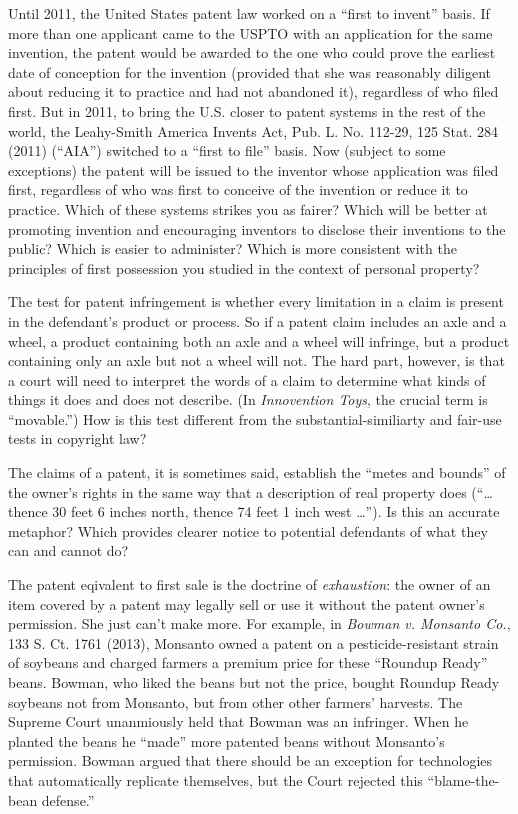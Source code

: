 \item Until 2011, the United States patent law worked on a ``first to invent''
basis. If more than one applicant came to the USPTO with an application for the
same invention, the patent would be awarded to the one who could prove the
earliest date of conception for the invention (provided that she was reasonably
diligent about reducing it to practice and had not abandoned it), regardless of
who filed first. But in 2011, to bring the U.S. closer to patent systems in the
rest of the world, the Leahy-Smith America Invents Act, Pub. L. No. 112-29, 125
Stat. 284 (2011) (``AIA'') switched to a ``first to file'' basis.  Now (subject
to some exceptions) the patent will be issued to the inventor whose application
was filed first, regardless of who was first to conceive of the invention or
reduce it to practice. Which of these systems strikes you as fairer? Which will
be better at promoting invention and encouraging inventors to disclose their
inventions to the public? Which is easier to administer? Which is more
consistent with the principles of first possession you studied in the context
of personal property?

\item The test for patent infringement is whether every limitation in a claim is
present in the defendant's product or process. So if a patent claim includes an
axle and a wheel, a product containing both an axle and a wheel will infringe,
but a product containing only an axle but not a wheel will not. The hard part,
however, is that a court will need to interpret the words of a claim to
determine what kinds of things it does and does not describe. (In
\textit{Innovention Toys}, the crucial term is ``movable.'') How is this test
different from the substantial-similiarty and fair-use tests in copyright law?

The claims of a patent, it is sometimes said, establish the ``metes and bounds''
of the owner's rights in the same way that a description of real property does
(``{\dots} thence 30 feet 6 inches north, thence 74 feet 1 inch west
{\dots}''). Is this an accurate metaphor? Which provides clearer notice to
potential defendants of what they can and cannot do?


\item The patent eqivalent to first sale is the doctrine of \textit{exhaustion}:
the owner of an item covered by a patent may legally sell or use it without the
patent owner's permission. She just can't make more. For example, in
\textit{Bowman v. Monsanto Co.}, 133 S. Ct. 1761 (2013), Monsanto owned a
patent on a pesticide-resistant strain of soybeans and charged farmers a
premium price for these ``Roundup Ready'' beans. Bowman, who liked the beans
but not the price, bought Roundup Ready soybeans not from Monsanto, but from
other other farmers' harvests. The Supreme Court unanmiously held that Bowman
was an infringer. When he planted the beans he ``made'' more patented beans
without Monsanto's permission. Bowman argued that there should be an exception
for technologies that automatically replicate themselves, but the Court
rejected this ``blame-the-bean defense.''


